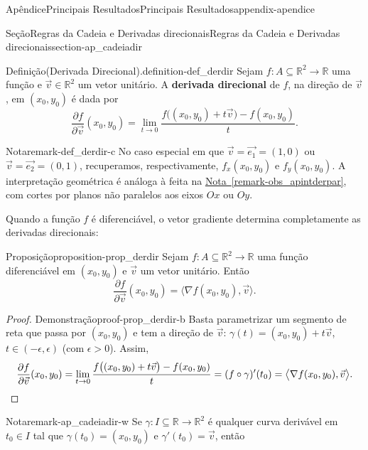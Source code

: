 \documentclass[oneside,10pt,]{book}
\newcommand{\xreffont}{\relax}
\newcommand{\terminology}[1]{\textbf{#1}}
\numberwithin{equation}{section}
\newcommand{\qedhere}{\relax}
\newcommand{\R}{\mathbb R}
\begin{document}
\begin{appendixptx}{Apêndice}{Principais Resultados}{}{Principais Resultados}{}{}{appendix-apendice}
\begin{sectionptx}{Seção}{Regras da Cadeia e Derivadas direcionais}{}{Regras da Cadeia e Derivadas direcionais}{}{}{section-ap_cadeiadir}
\begin{definition}{Definição}{(Derivada Direcional).}{definition-def_derdir}%
Sejam \(f\colon A\subseteq\R^2\to\R\) uma função e \(\vec{v}\in\R^2\) um vetor unitário. A \terminology{derivada direcional} de \(f\), na direção de \(\vec{v}\), em \((x_0,y_0)\) é dada por%
\begin{equation*}
\dfrac{\partial f}{\partial
\vec{v}}(x_0,y_0)=\lim\limits_{t\to
0}\dfrac{f\big((x_0,y_0)+t\vec{v}\big)-f(x_0,y_0)}{t}.
\end{equation*}
%
\begin{remark}{Nota}{}{remark-def_derdir-c}%
No caso especial em que \(\vec{v}=\vec{e_1}=(1,0)\) ou \(\vec{v}=\vec{e_2}=(0,1)\), recuperamos, respectivamente, \(f_x(x_0,y_0)\) e \(f_y(x_0,y_0)\). A interpretação geométrica é análoga à feita na \hyperref[remark-obs_apintderpar]{Nota~{\xreffont\ref{remark-obs_apintderpar}}}, com cortes por planos não paralelos aos eixos \(Ox\) ou \(Oy\).\end{remark}
\end{definition}
Quando a função \(f\) é diferenciável, o vetor gradiente determina completamente as derivadas direcionais:%
\begin{proposition}{Proposição}{}{}{proposition-prop_derdir}%
Sejam \(f\colon A\subseteq\R^2\to\R\) uma função diferenciável em \((x_0,y_0)\) e \(\vec{v}\) um vetor unitário. Então%
\begin{equation*}
\dfrac{\partial f}{\partial\vec{v}}(x_0,y_0)=\big\langle\nabla
f(x_0,y_0),\vec{v}\big\rangle.
\end{equation*}
\end{proposition}
\begin{proof}{Demonstração}{}{proof-prop_derdir-b}
Basta parametrizar um segmento de reta que passa por \((x_0,y_0)\) e tem a direção de \(\vec{v}\): \(\gamma(t)=(x_0,y_0)+t\vec{v}\), \(t\in
(-\epsilon,\epsilon)\) (com \(\epsilon > 0\)). Assim,%
\begin{equation*}
\dfrac{\partial f}{\partial
\vec{v}}(x_0,y_0)=\lim\limits_{t\to
0}\dfrac{f\big((x_0,y_0)+t\vec{v}\big)-f(x_0,y_0)}{t}=(f\circ\gamma)'(t_0)=\big\langle\nabla
f(x_0,y_0),\vec{v}\big\rangle.\qedhere
\end{equation*}
\end{proof}
\begin{remark}{Nota}{}{remark-ap_cadeiadir-w}%
Se \(\gamma:I\subseteq\R\to\R^2\) é qualquer curva derivável em \(t_0\in I\) tal que \(\gamma(t_0)=(x_0,y_0)\) e \(\gamma'(t_0)=\vec{v}\), então%
\begin{equation*}

\end{equation*}
\end{remark}
\end{sectionptx}
\end{appendixptx}
\end{document}
